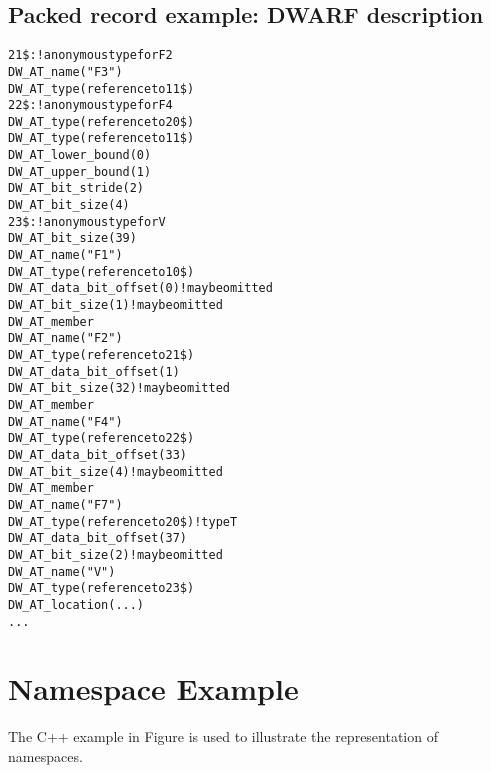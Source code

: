 \subsection{Packed record example: DWARF description}
\label{app:packedrecordexampledwarfdescription}
\begin{alltt}

21\$:  ! anonymous type for F2
            DW\-\_AT\-\_name("F3")
            DW\-\_AT\-\_type(reference to 11\$)
22\$:  ! anonymous type for F4
        DW\-\_AT\-\_type(reference to 20\$)
            DW\-\_AT\-\_type(reference to 11\$)
            DW\-\_AT\-\_lower\-\_bound(0)
            DW\-\_AT\-\_upper\-\_bound(1)
        DW\-\_AT\-\_bit\-\_stride(2)
        DW\-\_AT\-\_bit\-\_size(4)
23\$:  ! anonymous type for V
        DW\-\_AT\-\_bit\-\_size(39)
            DW\-\_AT\-\_name("F1")
            DW\-\_AT\-\_type(reference to 10\$)
            DW\-\_AT\-\_data\-\_bit\-\_offset(0)! may be omitted
            DW\-\_AT\-\_bit\-\_size(1) ! may be omitted
        DW\-\_AT\-\_member
            DW\-\_AT\-\_name("F2")
            DW\-\_AT\-\_type(reference to 21\$)
            DW\-\_AT\-\_data\-\_bit\-\_offset(1)
            DW\-\_AT\-\_bit\-\_size(32) ! may be omitted
        DW\-\_AT\-\_member
            DW\-\_AT\-\_name("F4")
            DW\-\_AT\-\_type(reference to 22\$)
            DW\-\_AT\-\_data\-\_bit\-\_offset(33)
            DW\-\_AT\-\_bit\-\_size(4) ! may be omitted
        DW\-\_AT\-\_member
            DW\-\_AT\-\_name("F7")
            DW\-\_AT\-\_type(reference to 20\$) ! type T
            DW\-\_AT\-\_data\-\_bit\-\_offset(37)
            DW\-\_AT\-\_bit\-\_size(2) ! may be omitted
        DW\-\_AT\-\_name("V")
        DW\-\_AT\-\_type(reference to 23\$)
        DW\-\_AT\-\_location(...)
        ...
\end{alltt}

\section{Namespace Example}
\label{app:namespaceexample}


The C++ example in 
Figure 
is used to illustrate the representation of namespaces.

